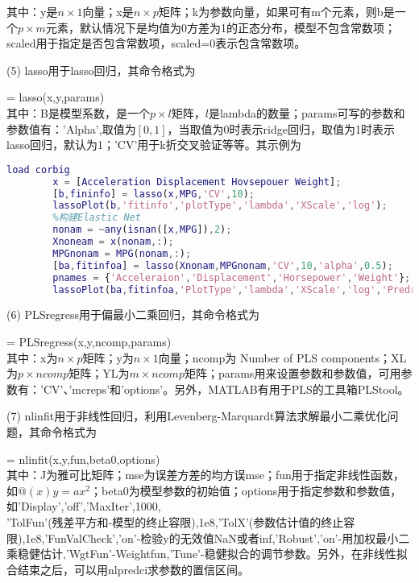         其中：y是$n\times 1$向量；x是$n\times p$矩阵；k为参数向量，如果可有m个元素，则b是一个$p\times m$元素，默认情况下是均值为0方差为1的正态分布，模型不包含常数项；scaled用于指定是否包含常数项，scaled=0表示包含常数项。
        \par
        (5) lasso用于lasso回归，其命令格式为\par
        [B,FitInfo] = lasso(x,y,params)\\
        其中：B是模型系数，是一个$p\times l$矩阵，$l$是lambda的数量；params可写的参数和参数值有：'Alpha',取值为$[0,1]$，当取值为0时表示ridge回归，取值为1时表示lasso回归，默认为1；'CV'用于k折交叉验证等等。其示例为
        \begin{lstlisting}[language = Matlab]
        load corbig
        x = [Acceleration Displacement Hovsepouer Weight];
        [b,fininfo] = lasso(x,MPG,'CV',10);
        lassoPlot(b,'fitinfo','plotType','lambda','XScale','log');
        %构建Elastic Net
        nonam = ~any(isnan([x,MPG]),2);
        Xnoneam = x(nonam,:);
        MPGnonam = MPG(nonam,:);
        [ba,fitinfoa] = lasso(Xnonam,MPGnonam,'CV',10,'alpha',0.5);
        pnames = {'Acceleraion','Displacement','Horsepower','Weight'};
        lassoPlot(ba,fitinfoa,'PlotType','lambda','XScale','log','PredretorNames','pnames');
        \end{lstlisting}
        \par
        (6) PLSregress用于偏最小二乘回归，其命令格式为\par
        [XL,YL,Xs,Ys,Beta,PctVar,Mse,Stats] = PLSregress(x,y,ncomp,params)\\
        其中：x为$n\times p$矩阵；y为$n\times 1$向量；ncomp为 Number of PLS components；XL为$p\times ncomp$矩阵；YL为$m\times ncomp$矩阵；params用来设置参数和参数值，可用参数有：'CV'、'mcreps'和'options'。另外，MATLAB有用于PLS的工具箱PLStool。
        \par
        (7) nlinfit用于非线性回归，利用Levenberg-Marquardt算法求解最小二乘优化问题，其命令格式为\par
        [beta,r,J,covb,mse] = nlinfit(x,y,fun,beta0,options)\\
        其中：J为雅可比矩阵；mse为误差方差的均方误mse；fun用于指定非线性函数，如$@(x) y=ax^2$；beta0为模型参数的初始值；options用于指定参数和参数值，如'Display','off','MaxIter',1000,\\'TolFun'(残差平方和-模型的终止容限),1e8,'TolX'(参数估计值的终止容限),1e8,'FunValCheck','on'-检验y的无效值NaN或者inf,'Robust','on'-用加权最小二乘稳健估计,'WgtFun'-Weightfun,'Tune'-稳健拟合的调节参数。另外，在非线性拟合结束之后，可以用nlpredci求参数的置信区间。

